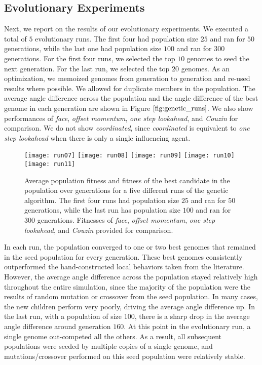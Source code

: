 \subsection{Evolutionary Experiments}
Next, we report on the results of our evolutionary experiments.
We executed a total of $5$ evolutionary runs.
The first four had population size $25$ and ran for $50$ generations, while the
last one had population size $100$ and ran for $300$ generations.
For the first four runs, we selected the top $10$ genomes to seed the next
generation.
For the last run, we selected the top $20$ genomes.
As an optimization, we memoized genomes from generation to generation and re-used
results where possible.
We allowed for duplicate members in the population.
The average angle difference across the population and the angle difference of
the best genome in each generation are shown in Figure $\ref{fig:genetic_runs}$.
We also show performances of \textit{face}, \textit{offset momentum},
\textit{one step lookahead}, and \textit{Couzin} for comparison.
We do not show \textit{coordinated}, since \textit{coordinated} is equivalent
to \textit{one step lookahead} when there is only a single influencing agent.
\begin{figure}
    \centering
    \texttt{[image: run07]}
    \texttt{[image: run08]}
    \texttt{[image: run09]}
    \texttt{[image: run10]}
    \texttt{[image: run11]}
    \caption{Average population fitness and fitness of the best candidate in the
    population over generations for a five different runs of the genetic algorithm.
    The first four runs had population size $25$ and ran for $50$ generations,
    while the last run has population size $100$ and ran for $300$ generations.
    Fitnesses of \textit{face}, \textit{offset momentum}, \textit{one step
    lookahead}, and \textit{Couzin} provided for comparison.}
    \label{fig:genetic_runs}
\end{figure}

In each run, the population converged to one or two best genomes that remained
in the seed population for every generation.
These best genomes consistently outperformed the hand-constructed local behaviors
taken from the literature.
However, the average angle difference across the population stayed relatively
high throughout the entire simulation, since the majority of the population
were the results of random mutation or crossover from the seed population.
In many cases, the new children perform very poorly, driving the average angle
difference up.
In the last run, with a population of size $100$, there is a sharp drop in the
average angle difference around generation $160$.
At this point in the evolutionary run, a single genome out-competed all the
others.
As a result, all subsequent populations were seeded by multiple copies of a
single genome, and mutations/crossover performed on this seed population
were relatively stable.

